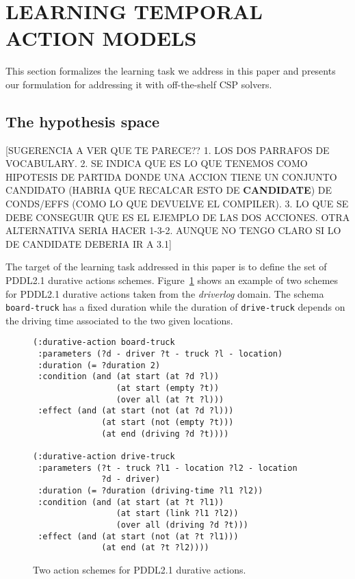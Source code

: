 \documentclass{ecai}
\begin{document}
\section{LEARNING TEMPORAL ACTION MODELS}
\label{section:learningTemporalModels}

This section formalizes the learning task we address in this paper and presents our formulation for addressing it with off-the-shelf CSP solvers.

\subsection{The hypothesis space}
\label{sec:action-space}

[SUGERENCIA A VER QUE TE PARECE?? 1. LOS DOS PARRAFOS DE VOCABULARY. 2. SE INDICA QUE ES LO QUE TENEMOS COMO HIPOTESIS DE PARTIDA DONDE UNA ACCION TIENE UN CONJUNTO CANDIDATO (HABRIA QUE RECALCAR ESTO DE \textbf{CANDIDATE}) DE CONDS/EFFS (COMO LO QUE DEVUELVE EL COMPILER). 3. LO QUE SE DEBE CONSEGUIR QUE ES EL EJEMPLO DE LAS DOS ACCIONES. OTRA ALTERNATIVA SERIA HACER 1-3-2. AUNQUE NO TENGO CLARO SI LO DE CANDIDATE DEBERIA IR A 3.1]

The target of the learning task addressed in this paper is to define the set of PDDL2.1 durative actions schemes. Figure~\ref{fig:exampleactions2} shows an example of two schemes for PDDL2.1 durative actions taken from the {\em driverlog} domain. The schema \texttt{board-truck} has a fixed duration while the duration of \texttt{drive-truck} depends on the driving time associated to the two given locations.

\begin{figure}
\begin{scriptsize}    
\begin{verbatim}
(:durative-action board-truck
 :parameters (?d - driver ?t - truck ?l - location)
 :duration (= ?duration 2)
 :condition (and (at start (at ?d ?l)) 
                 (at start (empty ?t))
                 (over all (at ?t ?l)))
 :effect (and (at start (not (at ?d ?l))) 
              (at start (not (empty ?t)))
              (at end (driving ?d ?t))))

(:durative-action drive-truck
 :parameters (?t - truck ?l1 - location ?l2 - location 
              ?d - driver)
 :duration (= ?duration (driving-time ?l1 ?l2))
 :condition (and (at start (at ?t ?l1)) 
                 (at start (link ?l1 ?l2))
                 (over all (driving ?d ?t)))
 :effect (and (at start (not (at ?t ?l1))) 
              (at end (at ?t ?l2))))
\end{verbatim}
\end{scriptsize}    
\caption{Two action schemes for PDDL2.1 durative actions.}
\label{fig:exampleactions2}
\end{figure}
\end{document}
